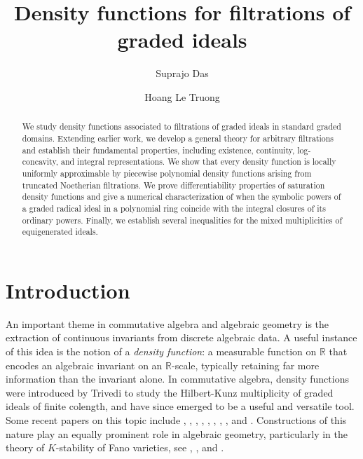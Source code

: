 \documentclass[12pt,a4paper]{amsart}
\theoremstyle{plain}
\theoremstyle{definition}
\numberwithin{equation}{theorem}
\begin{document}
\title{Density functions for filtrations of graded ideals}
\author{Suprajo Das}
\address{Mathematical and Physical Sciences Division, School of Arts and Sciences, Ahmedabad University, Navrangpura, Ahmedabad, Gujarat 380009, India}
\author{Hoang Le Truong}
\address{University of Engineering and Technology, Vietnam National University, Hanoi, Vietnam}
\maketitle

\begin{abstract}
We study density functions associated to filtrations of graded ideals in standard graded domains. Extending earlier work, we develop a general theory for arbitrary filtrations and establish their fundamental properties, including existence, continuity, log-concavity, and integral representations. We show that every density function is locally uniformly approximable by piecewise polynomial density functions arising from truncated Noetherian filtrations. We prove differentiability properties of saturation density functions and give a numerical characterization of when the symbolic powers of a graded radical ideal in a polynomial ring coincide with the integral closures of its ordinary powers. Finally, we establish several inequalities for the mixed multiplicities of equigenerated ideals.
\end{abstract}

\section{Introduction}

An important theme in commutative algebra and algebraic geometry is the extraction of continuous invariants from discrete algebraic data. A useful instance of this idea is the notion of a \emph{density function}: a measurable function on $\mathbb{R}$ that encodes an algebraic invariant on an $\mathbb{R}$-scale, typically retaining far more information than the invariant alone. In commutative algebra, density functions were introduced by Trivedi \cite{Tri18} to study the Hilbert-Kunz multiplicity of graded ideals of finite colength, and have since emerged to be a useful and versatile tool. Some recent papers on this topic include \cite{MT19}, \cite{MT20}, \cite{Tri20}, \cite{TW21}, \cite{TW23}, \cite{CSTZ24}, \cite{MM25}, \cite{DRT25}, and \cite{DRT26}. Constructions of this nature play an equally prominent role in algebraic geometry, particularly in the theory of $K$-stability of Fano varieties, see \cite{Li17}, \cite{Fuj18}, and \cite{BJ20}.
\end{document}
